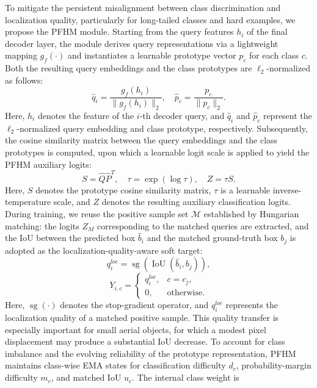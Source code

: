 \documentclass[letterpaper,journal]{IEEEtran}
\begin{document}
To mitigate the persistent misalignment between class discrimination and localization quality, particularly for long-tailed classes and hard examples, we propose the PFHM module. Starting from the query features $h_i$ of the final decoder layer, the module derives query representations via a lightweight mapping $g_f(\cdot)$ and instantiates a learnable prototype vector $p_c$ for each class $c$. Both the resulting query embeddings and the class prototypes are $\ell_2$-normalized as follows:
\begin{equation}
\hat{q}_i=\frac{g_f(h_i)}{\|g_f(h_i)\|_2},\quad
\hat{p}_c=\frac{p_c}{\|p_c\|_2}.
\end{equation}
Here, $h_i$ denotes the feature of the $i$-th decoder query, and $\hat{q}_i$ and $\hat{p}_c$ represent the $\ell_2$-normalized query embedding and class prototype, respectively. Subsequently, the cosine similarity matrix between the query embeddings and the class prototypes is computed, upon which a learnable logit scale is applied to yield the PFHM auxiliary logits:
\begin{equation}
S=\hat{Q}\hat{P}^{T},\quad
\tau=\exp(\log\tau),\quad
Z=\tau S.
\end{equation}
Here, $S$ denotes the prototype cosine similarity matrix, $\tau$ is a learnable inverse-temperature scale, and $Z$ denotes the resulting auxiliary classification logits. During training, we reuse the positive sample set $\mathcal{M}$ established by Hungarian matching: the logits $Z_M$ corresponding to the matched queries are extracted, and the IoU between the predicted box $\hat{b}_i$ and the matched ground-truth box $b_j$ is adopted as the localization-quality-aware soft target:
\begin{equation}
q_i^{loc}=\operatorname{sg}\left(\operatorname{IoU}(\hat{b}_i,b_j)\right),
\end{equation}
\begin{equation}
Y_{i,c}=
\begin{cases}
q_i^{loc}, & c=c_j,\\
0, & \text{otherwise}.
\end{cases}
\end{equation}
Here, $\operatorname{sg}(\cdot)$ denotes the stop-gradient operator, and $q_i^{loc}$ represents the localization quality of a matched positive sample. This quality transfer is especially important for small aerial objects, for which a modest pixel displacement may produce a substantial IoU decrease. To account for class imbalance and the evolving reliability of the prototype representation, PFHM maintains class-wise EMA states for classification difficulty $d_c$, probability-margin difficulty $m_c$, and matched IoU $u_c$. The internal class weight is
\end{document}
